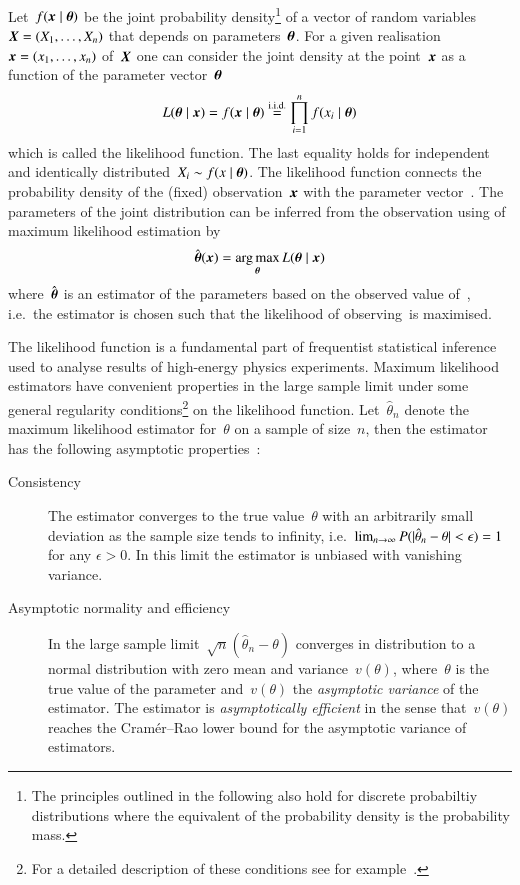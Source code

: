 Let~$f(\myvec{x} \mid \boldtheta)$ be the joint probability
density\footnote{The principles outlined in the following also hold
  for discrete probabiltiy distributions where the equivalent of the
  probability density is the probability mass.} of a vector of random
variables~$\myvec{X} = (X_1, \dots, X_n)$ that depends on
parameters~$\boldtheta$. For a given
realisation~$\myvec{x} = (x_1, \dots, x_n)$ of~$\myvec{X}$ one can
consider the joint density at the point~$\myvec{x}$ as a function of
the parameter vector~$\boldtheta$
\begin{align*}
  L(\boldtheta \mid \boldx) = f(\boldx \mid \boldtheta) \overset{\text{i.i.d.}}{=} \prod_{i=1}^n f(x_i \mid \boldtheta)
\end{align*}
which is called the likelihood function. The last equality holds for
independent and identically
distributed~$X_i \sim f(x \mid \boldtheta)$. The likelihood function
connects the probability density of the (fixed)
observation~$\myvec{x}$ with the parameter vector~\boldtheta. The
parameters of the joint distribution can be inferred from the
observation using of maximum likelihood estimation by
\begin{align*}
  \hat{\boldtheta}(\boldx) = \argmax_{\boldtheta} L(\boldtheta \mid \boldx)
\end{align*}
where~$\hat{\boldtheta}$ is an estimator of the parameters based on
the observed value of~, i.e.\ the estimator is chosen such
that the likelihood of observing~\boldx is maximised.

The likelihood function is a fundamental part of frequentist
statistical inference used to analyse results of high-energy physics
experiments. Maximum likelihood estimators have convenient properties
in the large sample limit under some general regularity
conditions\footnote{For a detailed description of these conditions see
  for example~\cite{casella2001}.} on the likelihood
function. Let~$\hat{\theta}_n$ denote the maximum likelihood estimator
for~$\theta$ on a sample of size~$n$, then the estimator has the
following asymptotic properties~\cite{casella2001}:
\begin{description}
\item[Consistency] The estimator converges to the true value~$\theta$
  with an arbitrarily small deviation as the sample size tends to
  infinity, i.e.\
  $\lim_{n \rightarrow \infty} P(|\hat{\theta}_n - \theta| < \epsilon) = 1$
  for any $\epsilon > 0$. In this limit the estimator is unbiased with
  vanishing variance.

\item[Asymptotic normality and efficiency] In the large sample
  limit~$\sqrt{n}(\hat{\theta}_n - \theta)$ converges in distribution
  to a normal distribution with zero mean and variance~$v(\theta)$,
  where~$\theta$ is the true value of the parameter and~$v(\theta)$
  the \textit{asymptotic variance} of the estimator. The estimator is
  \textit{asymptotically efficient} in the sense that~$v(\theta)$
  reaches the Cram\'er--Rao lower bound for the asymptotic variance of
  estimators.
\end{description}

